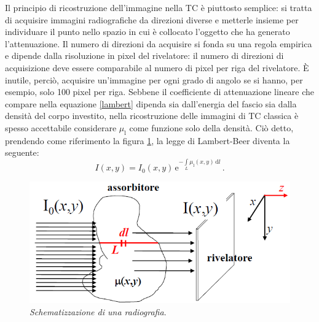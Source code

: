 \documentclass{report}
\newcommand{\figref}[1]{figura \ref{#1}}
\renewcommand{\eqref}[1]{equazione \ref{#1}}
\numberwithin{equation}{section}
\numberwithin{figure}{section}
\begin{document}
Il principio di ricostruzione dell'immagine nella TC è piuttosto semplice: si tratta di acquisire immagini radiografiche da direzioni diverse e metterle insieme per individuare il punto nello spazio in cui è collocato l'oggetto che ha generato l'attenuazione. Il numero di direzioni da acquisire si fonda su una regola empirica e dipende dalla risoluzione in pixel del rivelatore: il numero di direzioni di acquisizione deve essere comparabile al numero di pixel per riga del rivelatore. È inutile, perciò, acquisire un'immagine per ogni grado di angolo se si hanno, per esempio, solo 100 pixel per riga. Sebbene il coefficiente di attenuazione lineare che compare nella \eqref{lambert} dipenda sia dall'energia del fascio sia dalla densità del corpo investito, nella ricostruzione delle immagini di TC classica è spesso accettabile considerare $\mu_\mathrm{l}$ come funzione solo della densità. Ciò detto, prendendo come riferimento la \figref{fig:attenuazione}, la legge di Lambert-Beer diventa la seguente:
\begin{equation}
    I(x,y) = I_0(x,y)\,\mathrm{e}^{-\int\limits_L \mu_\mathrm{l} (x,y)\,\mathrm{d}l}\,.
\end{equation}

\begin{figure}[htp]
\centering
\includegraphics[scale=0.8]{immagini/attenuazione.png}
\caption{\label{fig:attenuazione} \textit{Schematizzazione di una radiografia}.}
\end{figure}
\end{document}
